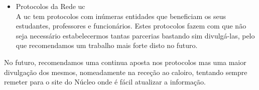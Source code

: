 \begin{itemize}
\item Protocolos da Rede \acrshort{uc}\\
A \acrshort{uc} tem protocolos com inúmeras entidades que beneficiam os seus estudantes, professores e funcionários. Estes protocolos fazem com que não seja necessário estabelecermos tantas parcerias bastando sim divulgá-las, pelo que recomendamos um trabalho mais forte disto no futuro.
\end{itemize}

No futuro, recomendamos uma continua aposta nos protocolos mas uma maior divulgação dos mesmos, nomeadamente na receção ao caloiro, tentando sempre remeter para o site do Núcleo onde é fácil atualizar a informação.